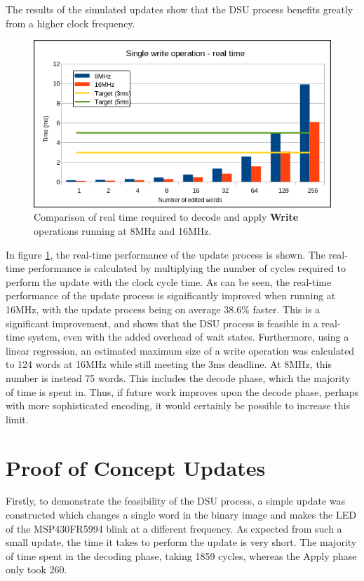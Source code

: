 The results of the simulated updates show that the DSU process benefits greatly from a higher clock frequency. 
\begin{figure}[!ht]
    \begin{shaded}
        \centering
        \includegraphics[width=\figurewidth]{img/W8vs16_rt.png}
        \caption{Comparison of real time required to decode and apply \textbf{Write} operations running at 8MHz and 16MHz.}
        \label{fig:s8vs16}
    \end{shaded}
\end{figure}

In figure \ref{fig:s8vs16}, the real-time performance of the update process is shown. The real-time performance is calculated by multiplying the number of cycles required to perform the update with the clock cycle time. As can be seen, the real-time performance of the update process is significantly improved when running at 16MHz, with the update process being on average $38.6\%$ faster. This is a significant improvement, and shows that the DSU process is feasible in a real-time system, even with the added overhead of wait states. Furthermore, using a linear regression, an estimated maximum size of a write operation was calculated to 124 words at 16MHz while still meeting the 3ms deadline. At 8MHz, this number is instead 75 words. This includes the decode phase, which the majority of time is spent in. Thus, if future work improves upon the decode phase, perhaps with more sophisticated encoding, it would certainly be possible to increase this limit.

\section{Proof of Concept Updates}
Firstly, to demonstrate the feasibility of the DSU process, a simple update was constructed which changes a single word in the binary image and makes the LED of the MSP430FR5994 blink at a different frequency. As expected from such a small update, the time it takes to perform the update is very short. The majority of time spent in the decoding phase, taking 1859 cycles, whereas the Apply phase only took 260. 

